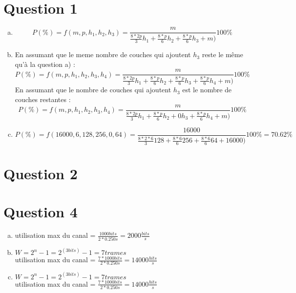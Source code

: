 
\section{Question 1}
\begin{enumerate}[(a)]
	\item \[ P(\%) = f(m, p, h_1, h_2, h_3) = 
		\frac{m}{\frac{8*2p}{3}h_1 + \frac{8*p}{6}h_2 + \frac{8*p}{6}h_3 + m)} 100\%\]
	
	\item En assumant que le meme nombre de couches qui ajoutent $h_3$ reste le même qu'à la
		question a) :
		\[ P(\%) = f(m, p, h_1, h_2, h_3, h_4) = 
		\frac{m}{\frac{8*2p}{3}h_1 + \frac{8*p}{6}h_2 + \frac{8*p}{6}h_3 + \frac{8*p}{6}h_4 + m)} 100\%\]
	En assumant que le nombre de couches qui ajoutent $h_3$ est le nombre de couches restantes :  
		\[ P(\%) = f(m, p, h_1, h_2, h_3, h_4) = 
		\frac{m}{\frac{8*2p}{3}h_1 + \frac{8*p}{6}h_2 + 0h_3 + \frac{8*p}{6}h_4 + m)} 100\%\]
	\item
		\[ P(\%) = f(16000, 6, 128, 256, 0, 64) = 
		\frac{16000}{\frac{8*2*6}{3}128 + \frac{8*6}{6}256 + \frac{8*6}{6}64 + 16000)} 100\% = 70.62\%\]
\end{enumerate}


\section{Question 2}



\section{Question 4}
\begin{enumerate}[(a)]
	\item 
		utilisation max du canal = $\frac{1000 bits}{2 * 0.250s} = 2000\frac{bits}{s}$
	\item
		$W = 2^n-1 = 2^(3bits)-1 = 7 trames$\\
		utilisation max du canal = $\frac{7 * 1000 bits}{2 * 0.250s} = 14000\frac{bits}{s}$
	\item
		$W = 2^n-1 = 2^(3bits)-1 = 7 trames$\\
		utilisation max du canal = $\frac{7 * 1000 bits}{2 * 0.250s} = 14000\frac{bits}{s}$
\end{enumerate}

